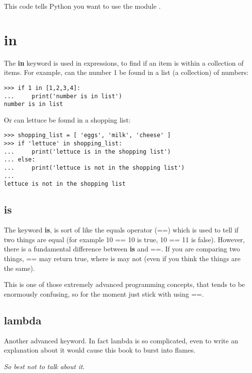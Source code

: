 This code tells Python you want to use the module .

\section*{in}

The \textbf{in} keyword is used in expressions, to find if an item is within a collection of items. For example, can the number 1 be found in a list (a collection) of numbers:

\begin{Verbatim}[frame=single]
>>> if 1 in [1,2,3,4]:
...     print('number is in list')
number is in list
\end{Verbatim}

\noindent
Or can lettuce be found in a shopping list:

\begin{Verbatim}[frame=single]
>>> shopping_list = [ 'eggs', 'milk', 'cheese' ]
>>> if 'lettuce' in shopping_list:
...     print('lettuce is in the shopping list')
... else:
...     print('lettuce is not in the shopping list')
...
lettuce is not in the shopping list
\end{Verbatim}

\subsection*{is}

The keyword \textbf{is}, is sort of like the equals operator (==) which is used to tell if two things are equal (for example 10 == 10 is true, 10 == 11 is false).  However, there is a fundamental difference between \textbf{is} and ==. If you are comparing two things, == may return true, where is may not (even if you think the things are the same).
\par
This is one of those extremely advanced programming concepts, that tends to be enormously confusing, so for the moment just stick with using ==.

\subsection*{lambda}

Another advanced keyword. In fact lambda is so complicated, even to write an explanation about it would cause this book to burst into flames.
\par
\emph{So best not to talk about it.}

